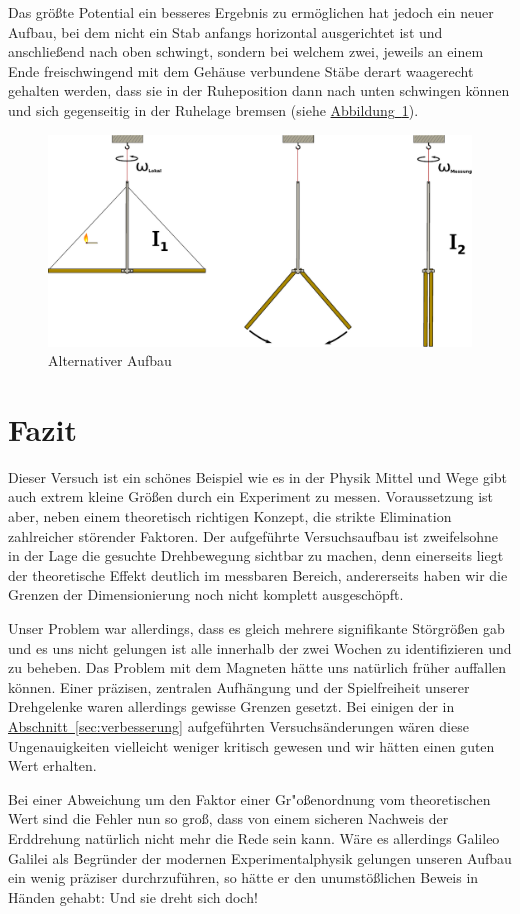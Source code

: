\documentclass[halfparskip, 11pt]{scrartcl}
\newcommand{\hypref}[2]{\hyperref[#2]{{#1}~\ref{#2}}}
\begin{document}
Das größte Potential ein besseres Ergebnis zu ermöglichen hat jedoch ein neuer Aufbau, bei dem nicht ein Stab anfangs horizontal ausgerichtet ist und anschließend nach oben schwingt, sondern bei welchem zwei, jeweils an einem Ende freischwingend mit dem Gehäuse verbundene Stäbe derart waagerecht gehalten werden, dass sie in der Ruheposition dann nach unten schwingen können und sich gegenseitig in der Ruhelage bremsen (siehe \hypref{Abbildung}{prinzip2}).

\begin{figure}[ht]
\centering
\includegraphics[width=1.\textwidth]{prinzip-2.pdf}
\caption{Alternativer Aufbau}
\label{prinzip2}
\end{figure}



\newpage
\section{Fazit} %
Dieser Versuch ist ein schönes Beispiel wie es in der Physik Mittel und Wege gibt auch extrem kleine Größen durch ein Experiment zu messen.
Voraussetzung ist aber, neben einem theoretisch richtigen Konzept, die strikte Elimination zahlreicher störender Faktoren.
Der aufgeführte Versuchsaufbau ist zweifelsohne in der Lage die gesuchte Drehbewegung sichtbar zu machen, denn einerseits liegt der theoretische Effekt deutlich im messbaren Bereich, andererseits haben wir die Grenzen der Dimensionierung noch nicht komplett ausgeschöpft.

Unser Problem war allerdings, dass es gleich mehrere signifikante Störgrößen gab und es uns nicht gelungen ist alle innerhalb der zwei Wochen zu identifizieren und zu beheben.
Das Problem mit dem Magneten hätte uns natürlich früher auffallen können.
Einer präzisen, zentralen Aufhängung und der Spielfreiheit unserer Drehgelenke waren allerdings gewisse Grenzen gesetzt.
Bei einigen der in \hypref{Abschnitt}{sec:verbesserung} aufgeführten Versuchsänderungen wären diese Ungenauigkeiten vielleicht weniger kritisch gewesen und wir hätten einen guten Wert erhalten.

Bei einer Abweichung um den Faktor einer Gr"oßenordnung vom theoretischen Wert sind die Fehler nun so groß, dass von einem sicheren Nachweis der Erddrehung natürlich nicht mehr die Rede sein kann.
Wäre es allerdings Galileo Galilei als Begründer der modernen Experimentalphysik gelungen unseren Aufbau ein wenig präziser durchrzuführen, so hätte er den unumstößlichen Beweis in Händen gehabt:
Und sie dreht sich doch!
\end{document}
